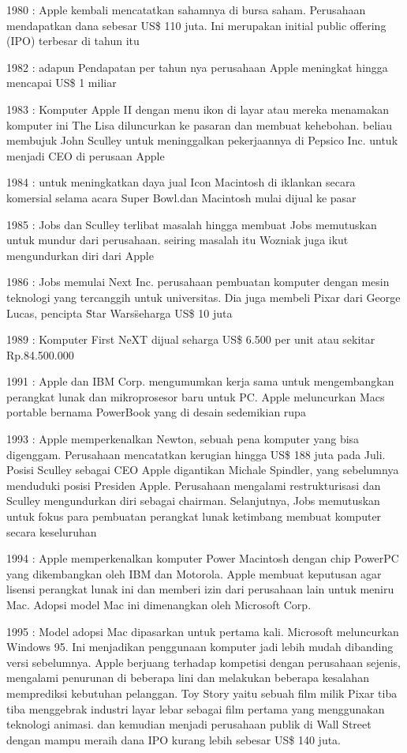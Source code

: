1980 : Apple kembali mencatatkan sahamnya di bursa saham. Perusahaan mendapatkan dana sebesar US\$ 110 juta. Ini merupakan initial public offering (IPO) terbesar di tahun itu

1982 : adapun Pendapatan per tahun nya perusahaan Apple meningkat hingga mencapai US\$ 1 miliar

1983 : Komputer Apple II dengan menu ikon di layar atau mereka menamakan komputer ini The Lisa diluncurkan ke pasaran dan membuat kehebohan. beliau membujuk John Sculley untuk meninggalkan pekerjaannya di Pepsico Inc. untuk menjadi CEO di perusaan Apple

1984 : untuk meningkatkan daya jual Icon Macintosh di iklankan secara komersial selama acara Super Bowl.dan Macintosh mulai dijual ke pasar

1985 : Jobs dan Sculley terlibat masalah hingga membuat Jobs memutuskan untuk mundur dari perusahaan. seiring masalah itu Wozniak juga ikut mengundurkan diri dari Apple

1986 : Jobs memulai Next Inc. perusahaan pembuatan komputer dengan mesin teknologi yang tercanggih untuk universitas. Dia juga membeli Pixar dari George Lucas, pencipta \"Star Wars\" seharga US\$ 10 juta 

1989 : Komputer First NeXT dijual seharga US\$ 6.500 per unit atau sekitar Rp.84.500.000 

1991 : Apple dan IBM Corp. mengumumkan kerja sama untuk mengembangkan perangkat lunak dan mikroprosesor baru untuk PC. Apple meluncurkan Macs portable bernama PowerBook yang di desain sedemikian rupa

1993 : Apple memperkenalkan Newton, sebuah pena komputer yang bisa digenggam. Perusahaan mencatatkan kerugian hingga US\$ 188 juta pada Juli. Posisi Sculley sebagai CEO Apple digantikan Michale Spindler, yang sebelumnya menduduki posisi Presiden Apple. Perusahaan mengalami restrukturisasi dan Sculley mengundurkan diri sebagai chairman. Selanjutnya, Jobs memutuskan untuk fokus para pembuatan perangkat lunak ketimbang membuat komputer secara keseluruhan

1994 : Apple memperkenalkan komputer Power Macintosh dengan chip PowerPC yang dikembangkan oleh IBM dan Motorola. Apple membuat keputusan agar lisensi perangkat lunak ini dan memberi izin dari perusahaan lain untuk meniru Mac. Adopsi model Mac ini dimenangkan oleh Microsoft Corp. 

1995 : Model adopsi Mac dipasarkan untuk pertama kali. Microsoft meluncurkan Windows 95. Ini menjadikan penggunaan komputer jadi lebih mudah dibanding versi sebelumnya. Apple berjuang terhadap kompetisi dengan perusahaan sejenis, mengalami penurunan di beberapa lini dan melakukan beberapa kesalahan memprediksi kebutuhan pelanggan. Toy Story yaitu sebuah film milik Pixar tiba tiba menggebrak industri layar lebar sebagai film pertama yang menggunakan teknologi animasi. dan kemudian menjadi perusahaan publik di Wall Street dengan mampu meraih dana IPO kurang lebih sebesar US\$ 140 juta. 


